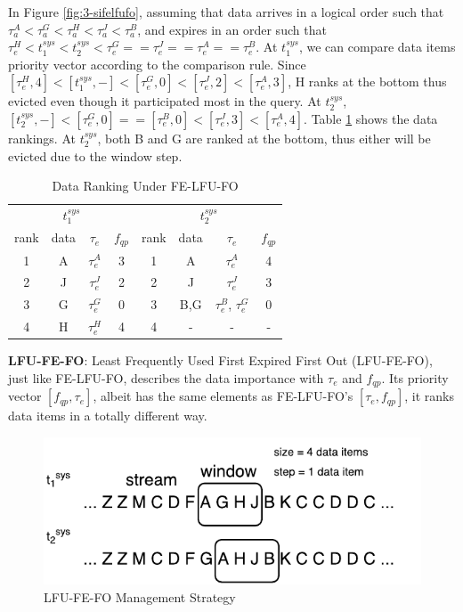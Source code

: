 In Figure \ref{fig:3-sifelfufo}, assuming that data arrives in a logical order such that $\tau^{A}_{a} < \tau^{G}_{a} < \tau^{H}_{a} < \tau^{J}_{a} < \tau^{B}_{a}$, and expires in an order such that $\tau^{H}_{e} < t^{sys}_{1} < t^{sys}_{2} < \tau^{G}_{e} == \tau^{J}_{e} == \tau^{A}_{e} == \tau^{B}_{e}$.
At $t^{sys}_{1}$, we can compare data items priority vector according to the comparison rule. 
Since $[\tau^{H}_{e}, 4] < [t^{sys}_{1}, -] < [\tau^{G}_{e}, 0] < [\tau^{J}_{e}, 2] < [\tau^{A}_{e}, 3]$, H ranks at the bottom thus evicted even though it participated most in the query. 
At $t^{sys}_{2}$, $[t^{sys}_{2}, -] < [\tau^{G}_{e}, 0] == [\tau^{B}_{e}, 0] < [\tau^{J}_{e}, 3] < [\tau^{A}_{e}, 4]$.
Table \ref{tab:felfufo} shows the data rankings. 
At $t^{sys}_{2}$, both B and G are ranked at the bottom, thus either will be evicted due to the window step. 

\begin{table}[!htbp]
\centering
\caption{Data Ranking Under FE-LFU-FO}
\label{tab:felfufo}
\begin{tabular}{|c|c|c|c||c|c|c|c|}
\hline
\multicolumn{4}{|c||}{$t^{sys}_{1}$} & \multicolumn{4}{c|}{$t^{sys}_{2}$} \\ \hhline{|====#====|}
rank & data & $\tau_{e}$ & $f_{qp}$ & rank & data & $\tau_{e}$ & $f_{qp}$ \\ \hhline{|=|=|=|=#=|=|=|=|}
1 & A & $\tau^{A}_{e}$ & 3 & 1 & A & $\tau^{A}_{e}$ & 4 \\ \hline
2 & J & $\tau^{J}_{e}$ & 2 & 2 & J & $\tau^{J}_{e}$ & 3 \\ \hline
3 & G & $\tau^{G}_{e}$ & 0 & 3 & B,G & $\tau^{B}_{e}$, $\tau^{G}_{e}$ & 0 \\ \hline
4 & H & $\tau^{H}_{e}$ & 4 & 4 & - & - & - \\ \hline
\end{tabular}
\end{table}

\textbf{LFU-FE-FO}:
Least Frequently Used First Expired First Out (LFU-FE-FO), just like FE-LFU-FO, describes the data importance with $\tau_{e}$ and $f_{qp}$. 
Its priority vector $[f_{qp}, \tau_{e}]$, albeit has the same elements as FE-LFU-FO's $[\tau_{e}, f_{qp}]$, it ranks data items in a totally different way. 

\begin{figure}[!htbp]
	\centering
    \includegraphics[width=5in]{img/3-silfufefo.pdf}
    \caption{LFU-FE-FO Management Strategy}
    \label{fig:3-silfufefo}
\end{figure}

